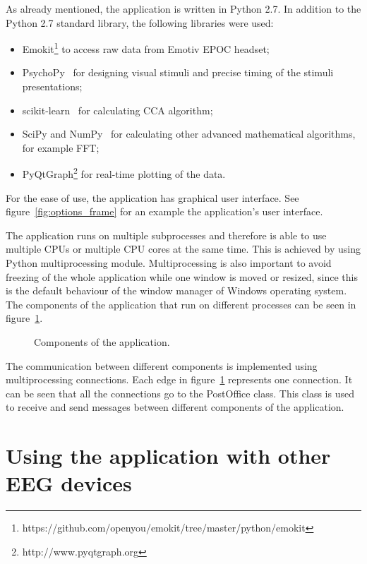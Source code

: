 As already mentioned, the application is written in Python 2.7. In addition to the Python 2.7 standard library, the following libraries were used:
\begin{itemize}
	\item Emokit\footnote{https://github.com/openyou/emokit/tree/master/python/emokit} to access raw data from Emotiv EPOC headset;
	\item PsychoPy~\cite{psychopy} for designing visual stimuli and precise timing of the stimuli presentations;
	\item scikit-learn~\cite{scikit-learn} for calculating \gls{CCA} algorithm;
	\item SciPy and NumPy~\cite{scipy} for calculating other advanced mathematical algorithms, for example \gls{FFT};
	\item PyQtGraph\footnote{http://www.pyqtgraph.org} for real-time plotting of the data.
\end{itemize} For the ease of use, the application has graphical user interface. See figure~\ref{fig:options_frame} for an example the application's user interface.

The application runs on multiple subprocesses and therefore is able to use multiple \glspl{CPU} or multiple \gls{CPU} cores at the same time. This is achieved by using Python multiprocessing module. Multiprocessing is also important to avoid freezing of the whole application while one window is moved or resized, since this is the default behaviour of the window manager of Windows operating system. The components of the application that run on different processes can be seen in figure~\ref{fig:class_diagram}.

\begin{figure}[h!]
	\centering
	
	\caption{Components of the application.}
	\label{fig:class_diagram}
\end{figure}

The communication between different components is implemented using multiprocessing connections. Each edge in figure~\ref{fig:class_diagram} represents one connection. It can be seen that all the connections go to the PostOffice class. This class is used to receive and send messages between different components of the application.

\section{Using the application with other EEG devices}
\label{sec:different_devices}

